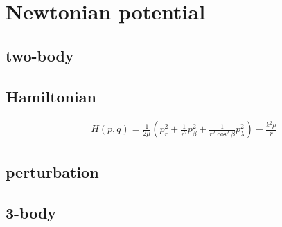 \documentclass[main.tex]{subfiles}
\begin{document}
\chapter{Newtonian potential}

\section{two-body}

\section{Hamiltonian}

\begin{align*}
&H(p,q)=\frac{1}{2\mu}(p_r^2+\frac{1}{r^2}p_{\beta}^2+\frac{1}{r^2\cos^2{\beta}}p_{\lambda}^2)-\frac{k^2\mu}{r}
\end{align*}


\section{perturbation}

\section{3-body}
\end{document}
